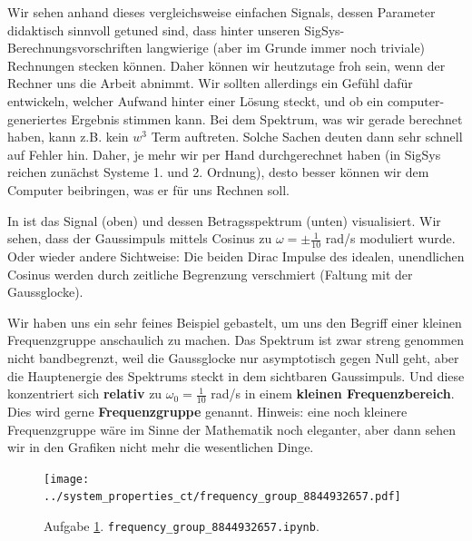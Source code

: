 \begin{Loesung}
Wir sehen anhand dieses vergleichsweise einfachen Signals, dessen Parameter
didaktisch sinnvoll getuned sind, dass hinter unseren SigSys-Berechnungsvorschriften
langwierige (aber im Grunde immer noch triviale)
Rechnungen stecken können. Daher können wir heutzutage froh sein,
wenn der Rechner uns die Arbeit abnimmt.
Wir sollten allerdings ein Gefühl dafür entwickeln, welcher Aufwand hinter
einer Lösung steckt, und ob ein computer-generiertes Ergebnis stimmen
kann. Bei dem Spektrum, was wir gerade berechnet haben, kann z.B.
kein $w^3$ Term auftreten. Solche Sachen deuten dann sehr schnell auf Fehler hin.
Daher, je mehr wir per Hand durchgerechnet haben (in SigSys reichen zunächst
Systeme 1. und 2. Ordnung), desto besser können wir dem Computer beibringen, was er
für uns Rechnen soll.

In  ist das Signal (oben) und dessen
Betragsspektrum (unten) visualisiert.
%
Wir sehen, dass der Gaussimpuls mittels Cosinus zu $\omega=\pm \frac{1}{10}$ rad/s
moduliert wurde.
Oder wieder andere Sichtweise: Die beiden Dirac Impulse des idealen, unendlichen
Cosinus werden durch zeitliche Begrenzung verschmiert (Faltung mit der Gaussglocke).
%

Wir haben uns ein sehr feines Beispiel gebastelt, um uns den
Begriff einer kleinen Frequenzgruppe anschaulich zu machen.
Das Spektrum ist zwar streng genommen nicht bandbegrenzt, weil die Gaussglocke
nur asymptotisch gegen Null geht, aber die Hauptenergie des Spektrums
steckt in dem sichtbaren Gaussimpuls.
Und diese konzentriert sich \textbf{relativ} zu $\omega_0=\frac{1}{10}$ rad/s in einem
\textbf{kleinen Frequenzbereich}. Dies wird gerne \textbf{Frequenzgruppe} genannt.
Hinweis: eine noch kleinere Frequenzgruppe wäre im Sinne der Mathematik noch
eleganter, aber dann sehen wir in den Grafiken nicht mehr die wesentlichen Dinge.
\end{Loesung}

\begin{figure}[h]
\centering
\texttt{[image: ../system\_properties\_ct/frequency\_group\_8844932657.pdf]}
\caption{Aufgabe \ref{fig:frequency_group_8844932657}. \texttt{frequency\_group\_8844932657.ipynb}.}
\label{fig:frequency_group_8844932657}
\end{figure}


